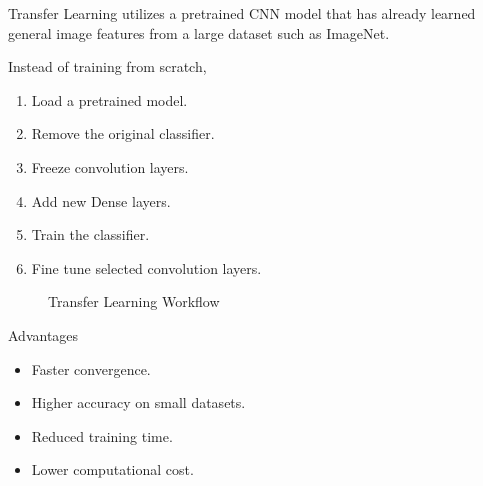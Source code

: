 \documentclass[11pt]{article}
\begin{document}
Transfer Learning utilizes a pretrained CNN model that has already learned
general image features from a large dataset such as ImageNet.

Instead of training from scratch,

\begin{enumerate}
\item Load a pretrained model.
\item Remove the original classifier.
\item Freeze convolution layers.
\item Add new Dense layers.
\item Train the classifier.
\item Fine tune selected convolution layers.
\end{enumerate}

\begin{figure}[H]

\centering


\caption{Transfer Learning Workflow}

\end{figure}

Advantages

\begin{itemize}
\item Faster convergence.
\item Higher accuracy on small datasets.
\item Reduced training time.
\item Lower computational cost.
\end{itemize}
\end{document}
